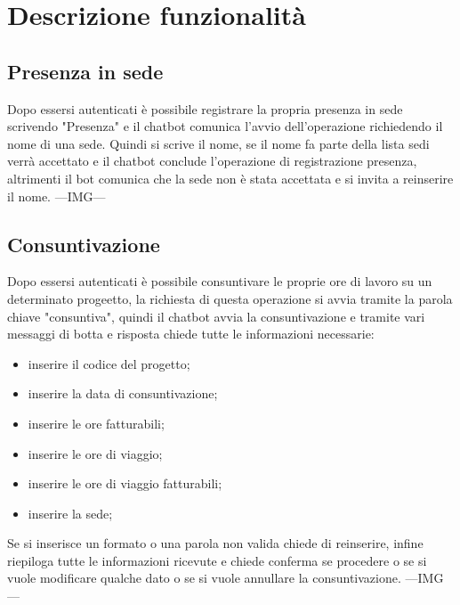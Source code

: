 \section{Descrizione funzionalità}
\subsection{Presenza in sede}
Dopo essersi autenticati è possibile registrare la propria presenza in sede scrivendo "Presenza" e il chatbot comunica l'avvio dell'operazione richiedendo il nome di una sede. 
Quindi si scrive il nome, se il nome fa parte della lista sedi verrà accettato e il chatbot conclude l'operazione di registrazione presenza, altrimenti il bot comunica che la sede non è stata accettata e si invita a reinserire il nome. ---IMG--- \newline
\subsection{Consuntivazione}
Dopo essersi autenticati è possibile consuntivare le proprie ore di lavoro su un determinato progeetto, la richiesta di questa operazione si avvia tramite la parola chiave "consuntiva", quindi il chatbot avvia la consuntivazione e tramite vari messaggi di botta e risposta chiede tutte le informazioni necessarie:
\begin{itemize}
    \item inserire il codice del progetto;
    \item inserire la data di consuntivazione;
    \item inserire le ore fatturabili;
    \item inserire le ore di viaggio;
    \item inserire le ore di viaggio fatturabili;
    \item inserire la sede;
\end{itemize}
Se si inserisce un formato o una parola non valida chiede di reinserire, infine riepiloga tutte le informazioni ricevute e chiede conferma se procedere o se si vuole modificare qualche dato o se si vuole annullare la consuntivazione. ---IMG---

\newpage